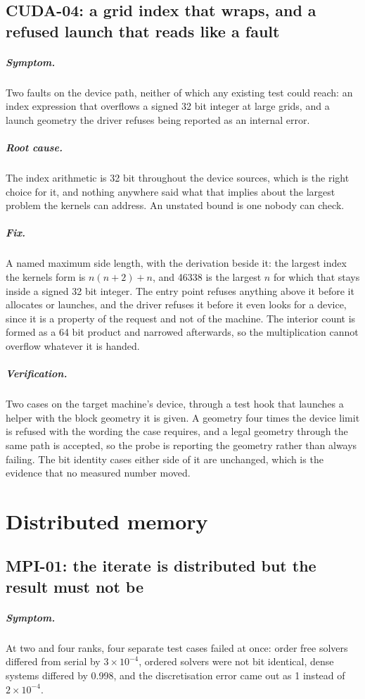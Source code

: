 \documentclass[11pt,a4paper]{report}
\newcommand{\symptom}[1]{\paragraph{Symptom.}#1}
\newcommand{\rootcause}[1]{\paragraph{Root cause.}#1}
\newcommand{\fix}[1]{\paragraph{Fix.}#1}
\newcommand{\verification}[1]{\paragraph{Verification.}#1}
\begin{document}
\section{CUDA-04: a grid index that wraps, and a refused launch that reads like a fault}

\symptom{Two faults on the device path, neither of which any existing test could
reach: an index expression that overflows a signed 32 bit integer at large grids,
and a launch geometry the driver refuses being reported as an internal error.}

\rootcause{The index arithmetic is 32 bit throughout the device sources, which is
the right choice for it, and nothing anywhere said what that implies about the
largest problem the kernels can address. An unstated bound is one nobody can
check.}

\fix{A named maximum side length, with the derivation beside it: the largest
index the kernels form is $n(n+2)+n$, and 46338 is the largest $n$ for which that
stays inside a signed 32 bit integer. The entry point refuses anything above it
before it allocates or launches, and the driver refuses it before it even looks
for a device, since it is a property of the request and not of the machine. The
interior count is formed as a 64 bit product and narrowed afterwards, so the
multiplication cannot overflow whatever it is handed.}

\verification{Two cases on the target machine's device, through a test hook that
launches a helper with the block geometry it is given. A geometry four times the
device limit is refused with the wording the case requires, and a legal geometry
through the same path is accepted, so the probe is reporting the geometry rather
than always failing. The bit identity cases either side of it are unchanged,
which is the evidence that no measured number moved.}

\chapter{Distributed memory}

\section{MPI-01: the iterate is distributed but the result must not be}

\symptom{At two and four ranks, four separate test cases failed at once: order
free solvers differed from serial by $3\times10^{-4}$, ordered solvers were not
bit identical, dense systems differed by 0.998, and the discretisation error came
out as 1 instead of $2\times10^{-4}$.}
\end{document}
